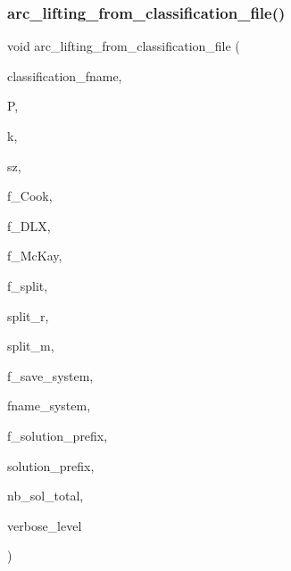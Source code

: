 \subsubsection{\texorpdfstring{arc\+\_\+lifting\+\_\+from\+\_\+classification\+\_\+file()}{arc\_lifting\_from\_classification\_file()}}
{\footnotesize\ttfamily void arc\+\_\+lifting\+\_\+from\+\_\+classification\+\_\+file (\begin{DoxyParamCaption}\item[{const \mbox{\hyperlink{galois_8h_ab6cc7b4aeb6ea31aba2b3fbfc83ff5e6}{B\+Y\+TE}} $\ast$}]{classification\+\_\+fname,  }\item[{\mbox{\hyperlink{classprojective__space}{projective\+\_\+space}} $\ast$}]{P,  }\item[{\mbox{\hyperlink{galois_8h_a09fddde158a3a20bd2dcadb609de11dc}{I\+NT}}}]{k,  }\item[{\mbox{\hyperlink{galois_8h_a09fddde158a3a20bd2dcadb609de11dc}{I\+NT}}}]{sz,  }\item[{\mbox{\hyperlink{galois_8h_a09fddde158a3a20bd2dcadb609de11dc}{I\+NT}}}]{f\+\_\+\+Cook,  }\item[{\mbox{\hyperlink{galois_8h_a09fddde158a3a20bd2dcadb609de11dc}{I\+NT}}}]{f\+\_\+\+D\+LX,  }\item[{\mbox{\hyperlink{galois_8h_a09fddde158a3a20bd2dcadb609de11dc}{I\+NT}}}]{f\+\_\+\+Mc\+Kay,  }\item[{\mbox{\hyperlink{galois_8h_a09fddde158a3a20bd2dcadb609de11dc}{I\+NT}}}]{f\+\_\+split,  }\item[{\mbox{\hyperlink{galois_8h_a09fddde158a3a20bd2dcadb609de11dc}{I\+NT}}}]{split\+\_\+r,  }\item[{\mbox{\hyperlink{galois_8h_a09fddde158a3a20bd2dcadb609de11dc}{I\+NT}}}]{split\+\_\+m,  }\item[{\mbox{\hyperlink{galois_8h_a09fddde158a3a20bd2dcadb609de11dc}{I\+NT}}}]{f\+\_\+save\+\_\+system,  }\item[{const \mbox{\hyperlink{galois_8h_ab6cc7b4aeb6ea31aba2b3fbfc83ff5e6}{B\+Y\+TE}} $\ast$}]{fname\+\_\+system,  }\item[{\mbox{\hyperlink{galois_8h_a09fddde158a3a20bd2dcadb609de11dc}{I\+NT}}}]{f\+\_\+solution\+\_\+prefix,  }\item[{const \mbox{\hyperlink{galois_8h_ab6cc7b4aeb6ea31aba2b3fbfc83ff5e6}{B\+Y\+TE}} $\ast$}]{solution\+\_\+prefix,  }\item[{\mbox{\hyperlink{galois_8h_a09fddde158a3a20bd2dcadb609de11dc}{I\+NT}} \&}]{nb\+\_\+sol\+\_\+total,  }\item[{\mbox{\hyperlink{galois_8h_a09fddde158a3a20bd2dcadb609de11dc}{I\+NT}}}]{verbose\+\_\+level }\end{DoxyParamCaption})}

